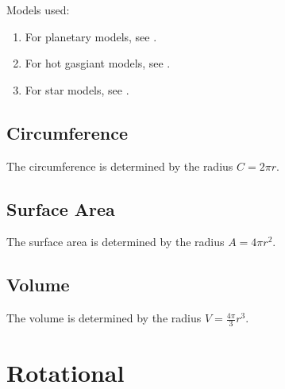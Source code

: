 \documentclass[letterpaper,10pt,english]{sphinxmanual}
\begin{document}
\sphinxAtStartPar
Models used:
\begin{enumerate}
%
\item {} 
\sphinxAtStartPar
For planetary models, see .

\item {} 
\sphinxAtStartPar
For hot gas\sphinxhyphen{}giant models, see .

\item {} 
\sphinxAtStartPar
For star models, see .

\end{enumerate}


\subsection{Circumference}
\label{\detokenize{quantities/geometric/circumference:circumference}}\label{\detokenize{quantities/geometric/circumference::doc}}\label{\detokenize{quantities/geometric/circumference:id1}}
\sphinxAtStartPar
The circumference is determined by the radius \(C = 2 \pi r\).


\subsection{Surface Area}
\label{\detokenize{quantities/geometric/surface_area:surface-area}}\label{\detokenize{quantities/geometric/surface_area::doc}}\label{\detokenize{quantities/geometric/surface_area:id1}}
\sphinxAtStartPar
The surface area is determined by the radius \(A = 4 \pi r^2\).


\subsection{Volume}
\label{\detokenize{quantities/geometric/volume:volume}}\label{\detokenize{quantities/geometric/volume::doc}}\label{\detokenize{quantities/geometric/volume:id1}}
\sphinxAtStartPar
The volume is determined by the radius \(V = \frac{4\pi}{3}r^3\).


\section{Rotational}
\label{\detokenize{quantities/rotational/rotational:rotational}}\label{\detokenize{quantities/rotational/rotational::doc}}
\end{document}
